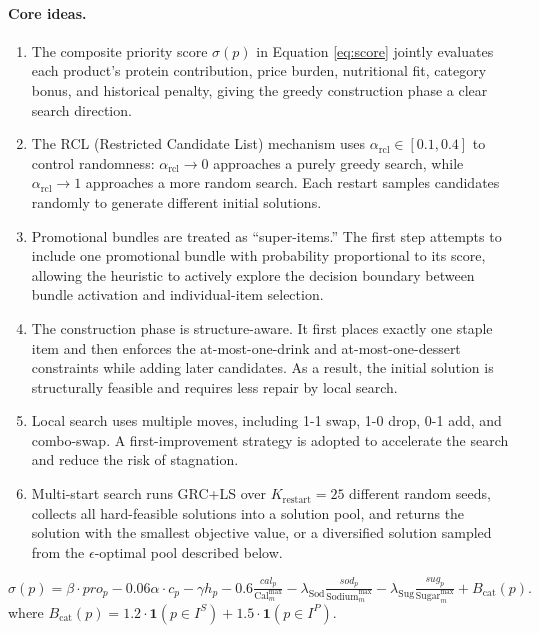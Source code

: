 \documentclass[a4paper]{article}
\begin{document}
\paragraph{Core ideas.}
\begin{enumerate}
\item The composite priority score $\sigma(p)$ in Equation \ref{eq:score} jointly evaluates each product's protein contribution, price burden, nutritional fit, category bonus, and historical penalty, giving the greedy construction phase a clear search direction.
\item The RCL (Restricted Candidate List) mechanism uses $\alpha_{\text{rcl}}\in[0.1,0.4]$ to control randomness: $\alpha_{\text{rcl}}\to 0$ approaches a purely greedy search, while $\alpha_{\text{rcl}}\to 1$ approaches a more random search. Each restart samples candidates randomly to generate different initial solutions.
\item Promotional bundles are treated as ``super-items.'' The first step attempts to include one promotional bundle with probability proportional to its score, allowing the heuristic to actively explore the decision boundary between bundle activation and individual-item selection.
\item The construction phase is structure-aware. It first places exactly one staple item and then enforces the at-most-one-drink and at-most-one-dessert constraints while adding later candidates. As a result, the initial solution is structurally feasible and requires less repair by local search.
\item Local search uses multiple moves, including 1-1 swap, 1-0 drop, 0-1 add, and combo-swap. A first-improvement strategy is adopted to accelerate the search and reduce the risk of stagnation.
\item Multi-start search runs GRC+LS over $K_{\text{restart}}=25$ different random seeds, collects all hard-feasible solutions into a solution pool, and returns the solution with the smallest objective value, or a diversified solution sampled from the $\epsilon$-optimal pool described below.
\end{enumerate}
\begin{equation}\label{eq:score}
\sigma(p) = \beta \cdot pro_p - 0.06\alpha\cdot c_p - \gamma h_p - 0.6\tfrac{cal_p}{\text{Cal}^{\max}_m} - \lambda_{\text{Sod}}\tfrac{sod_p}{\text{Sodium}^{\max}_m} - \lambda_{\text{Sug}}\tfrac{sug_p}{\text{Sugar}^{\max}_m} + B_{\text{cat}}(p).
\end{equation}
where $B_{\text{cat}}(p) = 1.2 \cdot \mathbf{1}(p\in I^S) + 1.5\cdot \mathbf{1}(p\in I^P)$.
\end{document}
